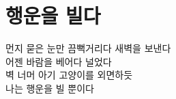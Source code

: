 \hypertarget{uxd589uxc6b4uxc744-uxbe4cuxb2e4}{%

\section{행운을 빌다}\label{uxd589uxc6b4uxc744-uxbe4cuxb2e4}}



먼지 묻은 눈만 끔뻑거리다 새벽을 보낸다\\

어젠 바람을 베어다 널었다\\

벽 너머 아기 고양이를 외면하듯\\

나는 행운을 빌 뿐이다

